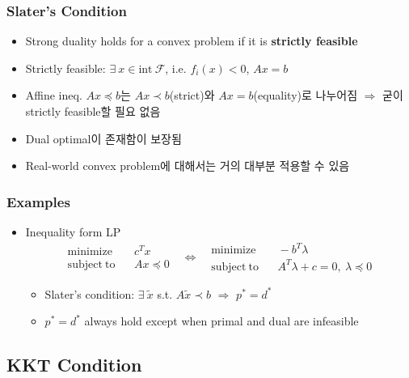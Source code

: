 \subsubsection*{Slater's Condition}
\begin{itemize}
    \item Strong duality holds for a convex problem if it is \textbf{strictly feasible}
    \item Strictly feasible: $\exists~x\in\mathrm{int}~\mathcal{F}$, i.e. $f_i(x)<0$, $Ax=b$
    \item Affine ineq. $Ax\preceq b$는 $Ax\prec b$(strict)와 $Ax=b$(equality)로 나누어짐 $\Rightarrow$ 굳이 strictly feasible할 필요 없음
    \item Dual optimal이 존재함이 보장됨
    \item Real-world convex problem에 대해서는 거의 대부분 적용할 수 있음
\end{itemize}

\subsubsection*{Examples}
\begin{itemize}
    \item Inequality form LP
        $$ \begin{aligned}
            \mathrm{minimize}~~&~~c^Tx \\
            \mathrm{subject~to}~~&~~Ax\preceq 0
        \end{aligned}~~~\Leftrightarrow~~~\begin{aligned}
            \mathrm{minimize}~~&~~-b^T\lambda \\
            \mathrm{subject~to}~~&~~A^T\lambda + c = 0,~\lambda\preceq 0
        \end{aligned} $$
    \begin{itemize}
        \item Slater's condition: $\exists~\tilde{x}$ s.t. $A\tilde{x}\prec b$ $\Rightarrow$ $p^\ast=d^\ast$
        \item $p^\ast=d^\ast$ always hold except when primal and dual are infeasible
    \end{itemize}
\end{itemize}

\subsection{KKT Condition}
